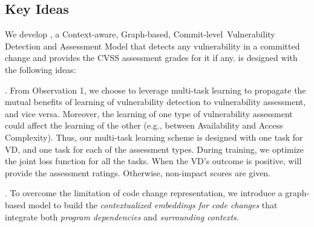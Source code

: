 \subsection{Key Ideas}
\label{key-ideas:sec}

We develop {\tool}, a Context-aware, Graph-based,
Commit-level~Vulnerability Detection and Assessment Model that detects
any vulnerability in a committed change and provides the CVSS
assessment grades for it if any.  {\tool} is designed with the
following ideas:

\vspace{1pt}
. From Observation 1, we choose to leverage multi-task learning
to propagate the mutual benefits of learning of vulnerability
detection to vulnerability assessment, and vice versa. Moreover, the
learning of one type of vulnerability assessment could affect the
learning of the other (e.g., between Availability and Access
Complexity). Thus, our multi-task learning scheme is designed
with one task for VD, and one task for each of the assessment types. During training, we optimize the joint loss function for all the tasks. When the
VD's outcome is positive, {\tool} will provide the assessment
ratings. Otherwise, non-impact scores are given.


\vspace{1pt}
. To overcome
the limitation of code change representation, we introduce a
graph-based model to build the {\em
contextualized embeddings for code changes} that integrate both {\em
program dependencies} and {\em surrounding contexts}.

